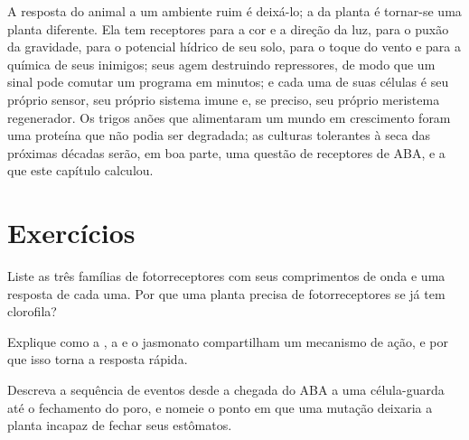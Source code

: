 \begin{remark}\label{rem:b3:plant-molecular-physiology:remark}
A resposta do animal a um ambiente ruim é deixá-lo; a da planta é tornar-se
uma planta diferente. Ela tem receptores para a cor e a direção da luz,
para o puxão da gravidade, para o potencial hídrico de seu solo, para o
toque do vento e para a química de seus inimigos; seus  agem
destruindo repressores, de modo que um sinal pode comutar um programa em
minutos; e cada uma de suas células é seu próprio sensor, seu próprio
sistema imune e, se preciso, seu próprio meristema regenerador. Os trigos
anões que alimentaram um mundo em crescimento foram uma proteína 
que não podia ser degradada; as culturas tolerantes à seca das próximas
décadas serão, em boa parte, uma questão de receptores de ABA,
 e a  que este capítulo
calculou.
\end{remark}

\section{Exercícios}

\begin{exercise}[$\star$]\label{exo:b3:plant-molecular-physiology:1}
Liste as três famílias de fotorreceptores com seus comprimentos de onda
e uma resposta de cada uma. Por que uma planta precisa de
fotorreceptores se já tem clorofila?
\end{exercise}

\begin{exercise}[$\star$]\label{exo:b3:plant-molecular-physiology:2}
Explique como a , a  e o jasmonato compartilham um
mecanismo de ação, e por que isso torna a resposta rápida.
\end{exercise}

\begin{exercise}[$\star$]\label{exo:b3:plant-molecular-physiology:3}
Descreva a sequência de eventos desde a chegada do ABA a uma
célula-guarda até o fechamento do poro, e nomeie o ponto em que uma
mutação deixaria a planta incapaz de fechar seus estômatos.
\end{exercise}

